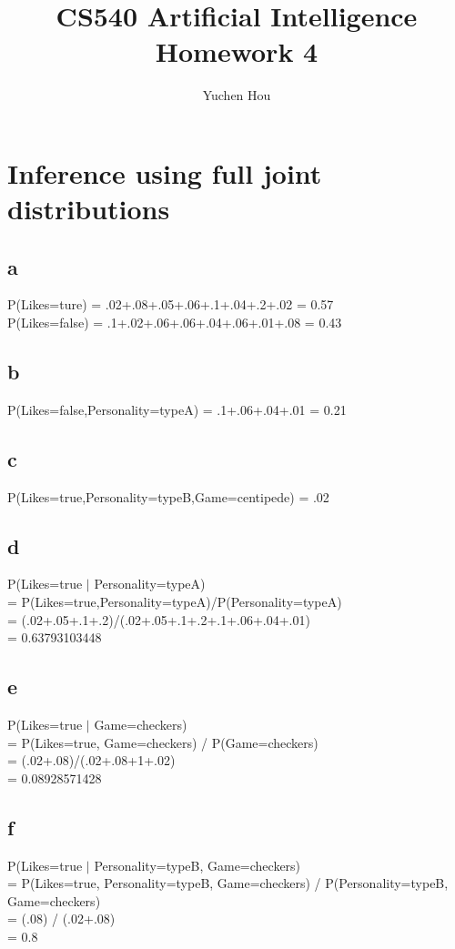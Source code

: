 \documentclass[12pt]{article}
\begin{document}
\title{CS540 Artificial Intelligence Homework 4}
\author{Yuchen Hou}
\maketitle

\section{Inference using full joint distributions}
\subsection{a}
P(Likes=ture) = .02+.08+.05+.06+.1+.04+.2+.02 = 0.57 \\
P(Likes=false) = .1+.02+.06+.06+.04+.06+.01+.08 = 0.43
\subsection{b}
P(Likes=false,Personality=typeA) = .1+.06+.04+.01 = 0.21
\subsection{c}
P(Likes=true,Personality=typeB,Game=centipede) = .02
\subsection{d}
P(Likes=true $|$ Personality=typeA)\\
= P(Likes=true,Personality=typeA)/P(Personality=typeA)\\
= (.02+.05+.1+.2)/(.02+.05+.1+.2+.1+.06+.04+.01)\\
= 0.63793103448
\subsection{e}
P(Likes=true $|$ Game=checkers)\\
= P(Likes=true, Game=checkers) / P(Game=checkers)\\
= (.02+.08)/(.02+.08+1+.02)\\
= 0.08928571428
\subsection{f}
P(Likes=true $|$ Personality=typeB, Game=checkers)\\
= P(Likes=true, Personality=typeB, Game=checkers) / P(Personality=typeB, Game=checkers)\\
= (.08) / (.02+.08)\\
= 0.8
\end{document}
